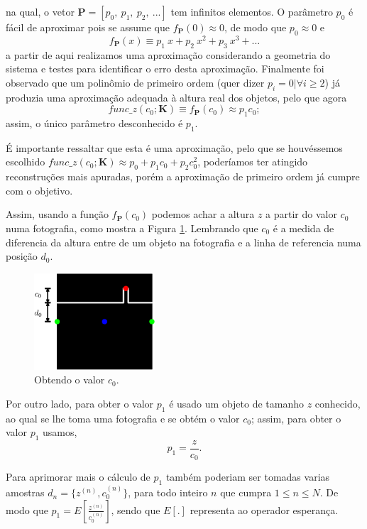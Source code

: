 \documentclass[a4paper, 12pt]{article}
\begin{document}
na qual, o vetor $\mathbf{P}=[p_0,~p_1,~p_2,~...]$ tem infinitos elementos. 
O parâmetro $p_0$ é fácil de aproximar pois se assume que $f_{\mathbf{P}}(0)\approx 0$,
de modo que $p_0\approx 0$ e 
\begin{equation}
f_{\mathbf{P}}(x)  \equiv p_1~x+p_2~x^2+p_3~x^3+...
\end{equation}
a partir de aqui realizamos uma aproximação considerando a geometria do sistema
e testes para identificar o erro desta aproximação. Finalmente foi observado
que um polinômio de primeiro ordem (quer dizer $p_i=0|\forall i\geq 2$) 
já produzia uma aproximação adequada à altura real dos objetos,
pelo que agora  
\begin{equation}
func\_z(c_0;\mathbf{K})\equiv f_{\mathbf{P}}(c_0)\approx p_1 c_0;
\end{equation}
assim, o único parâmetro desconhecido é $p_1$.
\begin{remark}
É importante ressaltar que esta é uma aproximação,
pelo que se houvéssemos escolhido
$func\_z(c_0;\mathbf{K}) \approx p_0 + p_1 c_0+p_2 c_0^2$,
poderíamos ter atingido reconstruções mais apuradas,
porém a aproximação de primeiro ordem já cumpre com o objetivo.
\end{remark}

Assim, usando a função $f_{\mathbf{P}}(c_0)$ podemos achar a altura $z$
a partir do valor $c_0$ numa fotografia, como mostra a Figura \ref{fig:setup1}.
Lembrando que $c_0$ é a medida de diferencia da altura entre de um objeto na fotografia
e a linha de referencia numa posição $d_0$.
\begin{figure}[!h]
     \centering
         \includegraphics[width=0.4\textwidth]{Diagrama7.eps}
\caption{Obtendo o valor $c_0$.}
\label{fig:setup1}
\end{figure}

Por outro lado, para obter o valor $p_1$ é usado um objeto de tamanho $z$ conhecido,
ao qual se lhe toma uma fotografia e se obtém o valor $c_0$;
assim, para obter o valor $p_1$ usamos,
\begin{equation}
p_1=\frac{z}{c_0}.
\end{equation}
\begin{remark}
Para aprimorar mais o cálculo de $p_1$ também poderiam ser tomadas varias amostras
$d_n=\{z^{(n)},c_0^{(n)}\}$, para todo inteiro $n$ que cumpra $1\leq n \leq N$.
De modo que $p_1=E\left[\frac{z^{(n)}}{c_0^{(n)}}\right]$, 
sendo que $E[.]$ representa ao operador esperança.
\end{remark}
\end{document}
